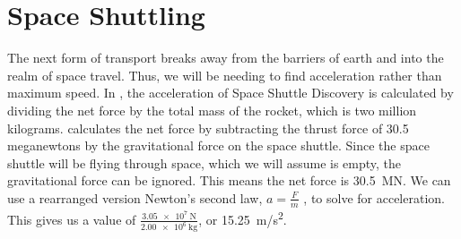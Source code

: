 \section{Space Shuttling}
	The next form of transport breaks away from the barriers of earth and into the realm of space travel. Thus, we will be needing to find acceleration rather than maximum speed. In \cite {rocketAcceleration}, the acceleration of Space Shuttle Discovery is calculated by dividing the net force by the total mass of the rocket, which is two million kilograms. \cite{rocketAcceleration} calculates the net force by subtracting the thrust force of 30.5 meganewtons by the gravitational force on the space shuttle. Since the space shuttle will be flying through space, which we will assume is empty, the gravitational force can be ignored. This means the net force is \SI{30.5}{\MN}. We can use a rearranged version Newton’s second law, $a = \frac{F}{m}$ , to solve for acceleration. This gives us a value of $\frac{\SI{3.05e7}{\newton}}{\SI{2.00e6}{\kg}}$, or \SI{15.25}{\metre/\second^2}.

